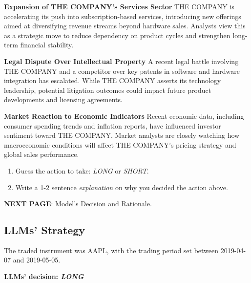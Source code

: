 \documentclass[8pt]{scrartcl}
\begin{document}
\textbf{Expansion of THE COMPANY’s Services Sector}
THE COMPANY is accelerating its push into subscription-based services, introducing new offerings aimed at diversifying revenue streams beyond hardware sales. Analysts view this as a strategic move to reduce dependency on product cycles and strengthen long-term financial stability.

\textbf{Legal Dispute Over Intellectual Property}
A recent legal battle involving THE COMPANY and a competitor over key patents in software and hardware integration has escalated. While THE COMPANY asserts its technology leadership, potential litigation outcomes could impact future product developments and licensing agreements.

\textbf{Market Reaction to Economic Indicators}
Recent economic data, including consumer spending trends and inflation reports, have influenced investor sentiment toward THE COMPANY. Market analysts are closely watching how macroeconomic conditions will affect THE COMPANY’s pricing strategy and global sales performance.

\begin{tcolorbox}[colback=blue!10, colframe=blue!60, title=\textbf{TASKS}, sharp corners=southwest]
\begin{enumerate}
    \item Guess the action to take: \textit{LONG} or \textit{SHORT}.
    \item Write a 1-2 sentence \textit{explanation} on why you decided the action above.
\end{enumerate}
\end{tcolorbox}

\textbf{NEXT PAGE}: Model's Decision and Rationale.

\newpage

\subsection*{LLMs' Strategy} \label{strategy2}

The traded instrument was AAPL, with the trading period set between 2019-04-07 and 2019-05-05.

\textbf{LLMs' decision: \textit{LONG}}
\end{document}
